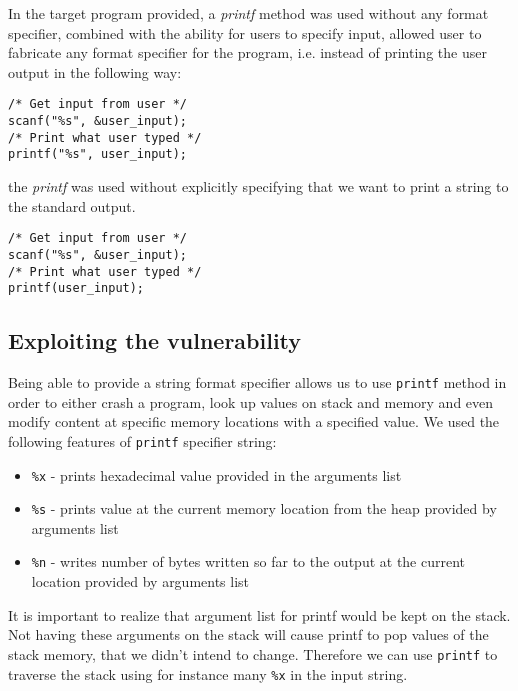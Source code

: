 \documentclass[12pt, a4paper, pdflatex]{article}
\begin{document}
In the target program provided, a \emph{printf} method was used without any format specifier, combined with the ability for users to specify input, allowed user to fabricate any format specifier for the program, i.e. instead of printing the user output in the following way:
\vspace{1em}
\lstset{
	captionpos=b,
	frame=single,
	language=C,
  breaklines=true,
	caption=Fragment of code that would not include the vulnerability,
	label=chroot:vul,
  float=tb
}
\begin{lstlisting}
/* Get input from user */
scanf("%s", &user_input);
/* Print what user typed */
printf("%s", user_input);
\end{lstlisting}
the \emph{printf} was used without explicitly specifying that we want to print a string to the standard output.
\vspace{1em}
\lstset{
	captionpos=b,
	frame=single,
	language=C,
  breaklines=true,
	caption=Fragment of includes the vulnerability,
	label=chroot:vul2,
  float=tb
}
\begin{lstlisting}
/* Get input from user */
scanf("%s", &user_input);
/* Print what user typed */
printf(user_input);
\end{lstlisting}


\subsection{Exploiting the vulnerability}
Being able to provide a string format specifier allows us to use \texttt{printf} method in order to either crash a program, look up values on stack and memory and even modify content at specific memory locations with a specified value. We used the following features of \texttt{printf} specifier string:
\begin{itemize}
	\item \texttt{\%x} - prints hexadecimal value provided in the arguments list
	\item \texttt{\%s} - prints value at the current memory location from the heap provided by arguments list
	\item \texttt{\%n} - writes number of bytes written so far to the output at the current location provided by arguments list
\end{itemize}
It is important to realize that argument list for printf would be kept on the stack. Not having these arguments on the stack will cause printf to pop values of the stack memory, that we didn't intend to change. Therefore we can use \texttt{printf} to traverse the stack using for instance many \texttt{\%x} in the input string.
\end{document}
